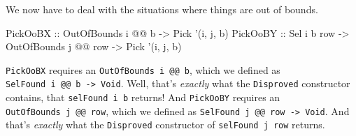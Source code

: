 \documentclass[]{article}
\newenvironment{Shaded}{}{}
\newcommand{\DataTypeTok}[1]{\textcolor[rgb]{0.56,0.13,0.00}{#1}}
\newcommand{\FunctionTok}[1]{\textcolor[rgb]{0.02,0.16,0.49}{#1}}
\newcommand{\NormalTok}[1]{#1}
\newcommand{\OtherTok}[1]{\textcolor[rgb]{0.00,0.44,0.13}{#1}}
\begin{document}
We now have to deal with the situations where things are out of bounds.

\begin{Shaded}
\begin{Highlighting}[]
\DataTypeTok{PickOoBX}\OtherTok{ ::} \DataTypeTok{OutOfBounds}\NormalTok{ i }\FunctionTok{@@}\NormalTok{ b}
         \OtherTok{->} \DataTypeTok{Pick}\NormalTok{ '(i, j, b)}
\DataTypeTok{PickOoBY}\OtherTok{ ::} \DataTypeTok{Sel}\NormalTok{ i b row}
         \OtherTok{->} \DataTypeTok{OutOfBounds}\NormalTok{ j }\FunctionTok{@@}\NormalTok{ row}
         \OtherTok{->} \DataTypeTok{Pick}\NormalTok{ '(i, j, b)}
\end{Highlighting}
\end{Shaded}

\texttt{PickOoBX} requires an \texttt{OutOfBounds\ i\ @@\ b}, which we defined
as \texttt{SelFound\ i\ @@\ b\ -\textgreater{}\ Void}. Well, that's
\emph{exactly} what the \texttt{Disproved} constructor contains, that
\texttt{selFound\ i\ b} returns! And \texttt{PickOoBY} requires an
\texttt{OutOfBounds\ j\ @@\ row}, which we defined as
\texttt{SelFound\ j\ @@\ row\ -\textgreater{}\ Void}. And that's \emph{exactly}
what the \texttt{Disproved} constructor of \texttt{selFound\ j\ row} returns.
\end{document}

